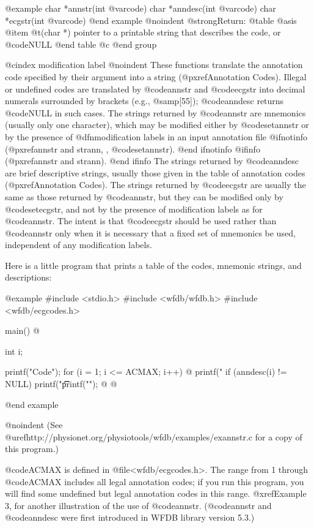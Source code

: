 {{{{{{{{@example
char *annstr(int @var{code})
char *anndesc(int @var{code})
char *ecgstr(int @var{code})
@end example
@noindent
@strong{Return:}
@table @asis
@item @t{(char *)}
pointer to a printable string that describes the code, or @code{NULL}
@end table
@c @end group

@cindex modification label
@noindent
These functions translate the annotation code specified by their argument
into a string (@pxref{Annotation Codes}).  Illegal or undefined codes
are translated by @code{annstr} and @code{ecgstr} into decimal numerals
surrounded by brackets (e.g., @samp{[55]}); @code{anndesc} returns @code{NULL}
in such cases.  The strings returned by @code{annstr} are mnemonics
(usually only one character), which may be modified either by @code{setannstr}
or by the presence of @dfn{modification labels} in an input annotation file
@ifnotinfo
(@pxref{annstr and strann, , @code{setannstr}}).
@end ifnotinfo
@ifinfo
(@pxref{annstr and strann}).
@end ifinfo
The strings returned by @code{anndesc} are brief descriptive strings,
usually those given in the table of annotation codes
(@pxref{Annotation Codes}).  The strings returned by
@code{ecgstr} are usually the same as those returned by @code{annstr},
but they can be modified only by @code{setecgstr}, and not by the
presence of modification labels as for @code{annstr}.  The intent is
that @code{ecgstr} should be used rather than @code{annstr} only when
it is necessary that a fixed set of mnemonics be used, independent of
any modification labels.

Here is a little program that prints a table of the codes, mnemonic
strings, and descriptions:

@example
#include <stdio.h>
#include <wfdb/wfdb.h>
#include <wfdb/ecgcodes.h>

main()
@{
    int i;

    printf("Code\tMnemonic\tDescription\n");
    for (i = 1; i <= ACMAX; i++) @{
        printf("%
        if (anndesc(i) != NULL)
            printf("\t\t%
        printf("\n");
    @}
@}
@end example

@noindent
(See @uref{http://physionet.org/physiotools/wfdb/examples/exannstr.c}
for a copy of this program.)

@code{ACMAX} is defined in @file{<wfdb/ecgcodes.h>}.  The range from 1
through @code{ACMAX} includes all legal annotation codes; if you run
this program, you will find some undefined but legal annotation codes in
this range. @xref{Example 3}, for another illustration of the use of
@code{annstr}.  (@code{annstr} and @code{anndesc} were first introduced
in WFDB library version 5.3.)

}}}}}}}}
